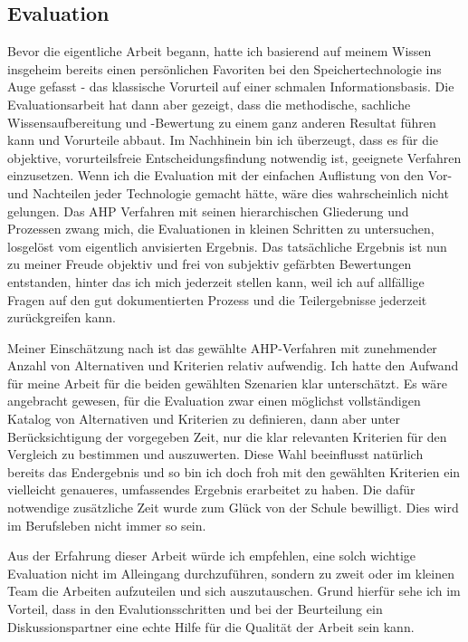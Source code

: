 \subsection*{Evaluation}
Bevor die eigentliche Arbeit begann, hatte ich basierend auf meinem Wissen insgeheim bereits einen persönlichen Favoriten bei den Speichertechnologie ins Auge gefasst - das klassische Vorurteil auf einer schmalen Informationsbasis. Die Evaluationsarbeit hat dann aber gezeigt, dass die methodische, sachliche Wissensaufbereitung und -Bewertung zu einem ganz anderen Resultat führen kann und Vorurteile abbaut. Im Nachhinein bin ich überzeugt, dass es für die objektive, vorurteilsfreie Entscheidungsfindung notwendig ist, geeignete Verfahren einzusetzen. Wenn ich die Evaluation mit der einfachen Auflistung von den Vor- und Nachteilen jeder Technologie gemacht hätte, wäre dies wahrscheinlich nicht gelungen. Das AHP Verfahren mit seinen hierarchischen Gliederung und Prozessen zwang mich, die Evaluationen in kleinen Schritten zu untersuchen, losgelöst vom eigentlich anvisierten Ergebnis. Das tatsächliche Ergebnis ist nun zu meiner Freude objektiv und frei von subjektiv gefärbten Bewertungen entstanden, hinter das ich mich jederzeit stellen kann, weil ich auf allfällige Fragen auf den gut dokumentierten Prozess und die Teilergebnisse jederzeit zurückgreifen kann. 

Meiner Einschätzung nach ist das gewählte AHP-Verfahren mit zunehmender Anzahl von Alternativen und Kriterien relativ aufwendig. Ich hatte den Aufwand für meine Arbeit für die beiden gewählten Szenarien klar unterschätzt. Es wäre angebracht gewesen, für die Evaluation zwar einen möglichst vollständigen Katalog von Alternativen und Kriterien zu definieren, dann aber unter Berücksichtigung der vorgegeben Zeit, nur die klar relevanten Kriterien für den Vergleich zu bestimmen und auszuwerten. Diese Wahl beeinflusst natürlich bereits das Endergebnis und so bin ich doch froh mit den gewählten Kriterien ein vielleicht genaueres, umfassendes Ergebnis erarbeitet zu haben. Die dafür notwendige zusätzliche Zeit wurde zum Glück von der Schule bewilligt. Dies wird im Berufsleben nicht immer so sein.

Aus der Erfahrung dieser Arbeit würde ich empfehlen, eine solch wichtige Evaluation nicht im Alleingang durchzuführen, sondern zu zweit oder im kleinen Team die Arbeiten aufzuteilen und sich auszutauschen. Grund hierfür sehe ich im Vorteil, dass in den Evalutionsschritten und bei der Beurteilung ein Diskussionspartner eine echte Hilfe für die Qualität der Arbeit sein kann.

